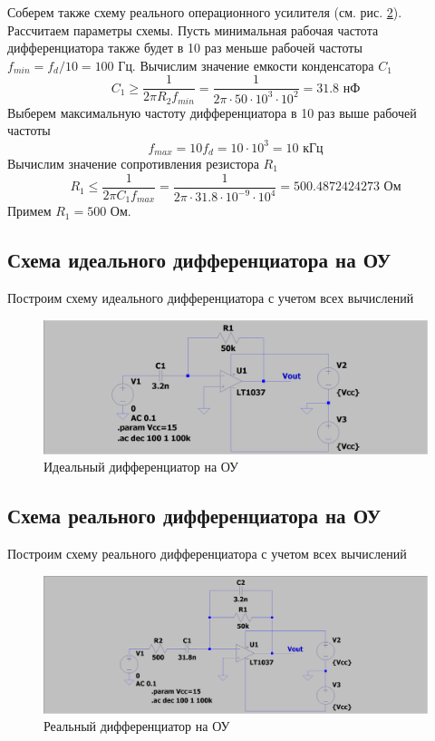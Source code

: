 \documentclass[a4paper, 12pt]{article}
\begin{document}
    Соберем также схему реального операционного усилителя (см. рис. \ref{fig:scheme11}). Рассчитаем параметры схемы.
    Пусть минимальная рабочая частота дифференциатора также будет в 10 раз меньше
    рабочей частоты $f_{min}=f_d/10=100$ Гц. Вычислим значение емкости конденсатора $C_1$
    $$
    C_1\geq\dfrac{1}{2\pi R_2f_{min}}=\dfrac{1}{2\pi\cdot50\cdot10^3\cdot10^2}=31.8\text{ нФ}
    $$
    Выберем максимальную частоту дифференциатора в 10 раз выше рабочей частоты
    $$
    f_{max}=10f_d=10\cdot10^3=10\text{ кГц}
    $$
    Вычислим значение сопротивления резистора $R_1$
    $$
    R_1\leq\dfrac{1}{2\pi C_1f_{max}}=\dfrac{1}{2\pi\cdot31.8\cdot10^{-9}\cdot10^4}=500.4872424273\text{ Ом}
    $$
    Примем $R_1=500$ Ом.


    \subsection{Схема идеального дифференциатора на ОУ}
    Построим схему идеального дифференциатора с учетом всех вычислений
    \begin{figure}[H]
        \centering
        \includegraphics[scale=0.22]{scheme10.png}
        \captionsetup{skip=0pt}
        \caption{Идеальный дифференциатор на ОУ}
        \label{fig:scheme10}
    \end{figure}


    \subsection{Схема реального дифференциатора на ОУ}
    Построим схему реального дифференциатора с учетом всех вычислений
    \begin{figure}[H]
        \centering
        \includegraphics[scale=0.22]{scheme11.png}
        \captionsetup{skip=0pt}
        \caption{Реальный дифференциатор на ОУ}
        \label{fig:scheme11}
    \end{figure}
\end{document}
